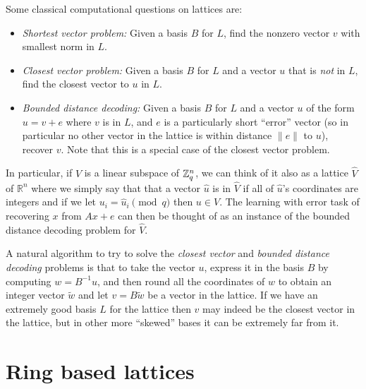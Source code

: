 Some classical computational questions on lattices are:

\begin{itemize}
\item
  \emph{Shortest vector problem:} Given a basis \(B\) for \(L\), find
  the nonzero vector \(v\) with smallest norm in \(L\).
\item
  \emph{Closest vector problem:} Given a basis \(B\) for \(L\) and a
  vector \(u\) that is \emph{not} in \(L\), find the closest vector to
  \(u\) in \(L\).
\item
  \emph{Bounded distance decoding:} Given a basis \(B\) for \(L\) and a
  vector \(u\) of the form \(u=v+e\) where \(v\) is in \(L\), and \(e\)
  is a particularly short ``error'' vector (so in particular no other
  vector in the lattice is within distance \(\|e\|\) to \(u\)), recover
  \(v\). Note that this is a special case of the closest vector problem.
\end{itemize}

In particular, if \(V\) is a linear subspace of \({\mathbb{Z}}_q^n\), we can think
of it also as a lattice \(\hat{V}\) of \(\mathbb{R}^n\) where we simply
say that that a vector \(\hat{u}\) is in \(\hat{V}\) if all of
\(\hat{u}\)'s coordinates are integers and if we let
\(u_i = \hat{u}_i \pmod{q}\) then \(u\in V\). The learning with error
task of recovering \(x\) from \(Ax+e\) can then be thought of as an
instance of the bounded distance decoding problem for \(\hat{V}\).

A natural algorithm to try to solve the \emph{closest vector} and
\emph{bounded distance decoding} problems is that to take the vector
\(u\), express it in the basis \(B\) by computing \(w = B^{-1}u\), and
then round all the coordinates of \(w\) to obtain an integer vector
\(\tilde{w}\) and let \(v=B\tilde{w}\) be a vector in the lattice. If we
have an extremely good basis \(L\) for the lattice then \(v\) may indeed
be the closest vector in the lattice, but in other more ``skewed'' bases
it can be extremely far from it.

\section{Ring based lattices}\label{12-Ring-based-lattices}

